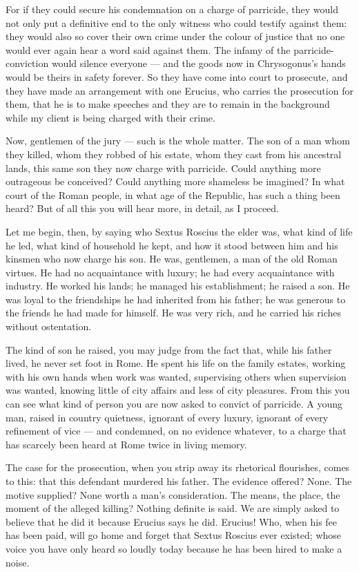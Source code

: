  For if they could secure his condemnation on a charge of parricide, they would not only put a definitive end to the only witness who could testify against them: they would also so cover their own crime under the colour of justice that no one would ever again hear a word said against them. The infamy of the parricide-conviction would silence everyone --- and the goods now in Chrysogonus's hands would be theirs in safety forever. So they have come into court to prosecute, and they have made an arrangement with one Erucius, who carries the prosecution for them, that he is to make speeches and they are to remain in the background while my client is being charged with their crime.

 Now, gentlemen of the jury --- such is the whole matter. The son of a man whom they killed, whom they robbed of his estate, whom they cast from his ancestral lands, this same son they now charge with parricide. Could anything more outrageous be conceived? Could anything more shameless be imagined? In what court of the Roman people, in what age of the Republic, has such a thing been heard? But of all this you will hear more, in detail, as I proceed.

 Let me begin, then, by saying who Sextus Roscius the elder was, what kind of life he led, what kind of household he kept, and how it stood between him and his kinsmen who now charge his son. He was, gentlemen, a man of the old Roman virtues. He had no acquaintance with luxury; he had every acquaintance with industry. He worked his lands; he managed his establishment; he raised a son. He was loyal to the friendships he had inherited from his father; he was generous to the friends he had made for himself. He was very rich, and he carried his riches without ostentation.

 The kind of son he raised, you may judge from the fact that, while his father lived, he never set foot in Rome. He spent his life on the family estates, working with his own hands when work was wanted, supervising others when supervision was wanted, knowing little of city affairs and less of city pleasures. From this you can see what kind of person you are now asked to convict of parricide. A young man, raised in country quietness, ignorant of every luxury, ignorant of every refinement of vice --- and condemned, on no evidence whatever, to a charge that has scarcely been heard at Rome twice in living memory.

 The case for the prosecution, when you strip away its rhetorical flourishes, comes to this: that this defendant murdered his father. The evidence offered? None. The motive supplied? None worth a man's consideration. The means, the place, the moment of the alleged killing? Nothing definite is said. We are simply asked to believe that he did it because Erucius says he did. Erucius! Who, when his fee has been paid, will go home and forget that Sextus Roscius ever existed; whose voice you have only heard so loudly today because he has been hired to make a noise.

